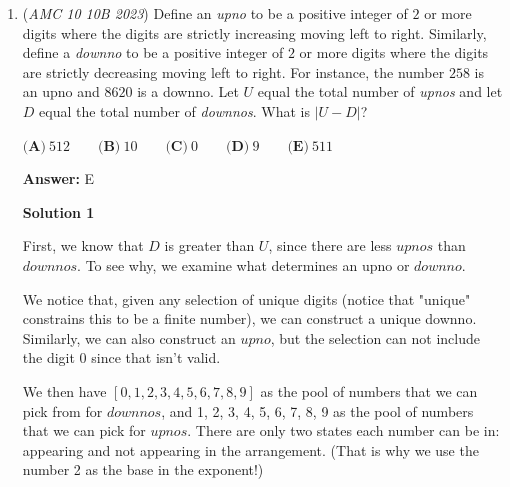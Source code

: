 \begin{enumerate}
\textbf{Solution 10 (Braindead solution)}

List out 1 to 16:

 
 \[1, 2, 3, 4, 5, 6, 7, 8, 9, 10, 11, 12, 13, 14, 15, 16.\]

 First, we remove all numbers that appear an even amount of times in the product:

 
 \[2, 4, 6, 8, 10, 12, 14, 16.\]

 Next, we remove all perfect squares:

 
 \[2, 6, 8, 10, 12, 14.\]

 Factoring each term gives:

 
 \[2^1, 2^1\cdot 3^1, 2^3, 2^1 \cdot 5^1, 2^2 \cdot 3^1, 2^1 \cdot 7^1.\]

 We multiply all the terms together and remove perfect squares to get $2^1 \cdot 5^1 \cdot 7^1 = \boxed{\text{ (C) }70}$.

 


	\item (\textit{AMC 10 10B 2023}) Define an \textit{upno} to be a positive integer of $2$ or more digits where the digits are strictly
increasing moving left to right. Similarly, define a \textit{downno} to be a positive integer 
of $2$ or more digits where the digits are strictly decreasing moving left to right. For
instance, the number $258$ is an upno and $8620$ is a downno. Let $U$ equal the total
number of \textit{upnos} and let $D$ equal the total number of \textit{downnos}. What is $|U-D|$?


 $\textbf{(A)}~512\qquad\textbf{(B)}~10\qquad\textbf{(C)}~0\qquad\textbf{(D)}~9\qquad\textbf{(E)}~511$

 \textbf{Answer: }E



\textbf{Solution 1}

First, we know that $D$ is greater than $U$, since there are less $upnos$ than $downnos$. To see why, we examine what determines an upno or $downno$. 

 We notice that, given any selection of unique digits (notice that "unique" constrains this to be a finite number), we can construct a unique downno. Similarly, we can also construct an $upno$, but the selection can not include the digit $0$ since that isn't valid. 

 We then have $[0, 1, 2, 3, 4, 5, 6, 7, 8, 9]$ as the pool of numbers that we can pick from for $downnos$, and {1, 2, 3, 4, 5, 6, 7, 8, 9} as the pool of numbers that we can pick for $upnos$.  There are only two states each number can be in: appearing and not appearing in the arrangement.  (That is why we use the number 2 as the base in the exponent!)


\end{enumerate}
